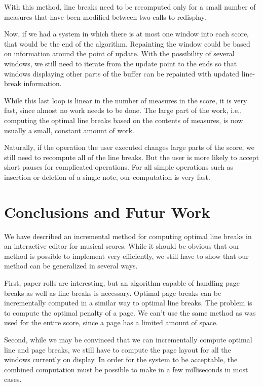 \documentclass{article}
\begin{document}
With this method, line breaks need to be recomputed only for a small
number of measures that have been modified between two calls to
redisplay. 

Now, if we had a system in which there is at most one window into
each score, that would be the end of the algorithm.  Repainting the
window could be based on information around the point of update.  With
the possibility of several windows, we still need to iterate from the
update point to the ends so that windows displaying other parts of the
buffer can be repainted with updated line-break information. 

While this last loop is linear in the number of measures in the score,
it is very fast, since almost no work needs to be done.  The large
part of the work, i.e., computing the optimal line breaks based on the
contents of measures, is now usually a small, constant amount of
work. 

Naturally, if the operation the user executed changes large parts of
the score, we still need to recompute all of the line breaks.  But the
user is more likely to accept short pauses for complicated
operations.  For all simple operations such as insertion or deletion
of a single note, our computation is very fast.

\section{Conclusions and Futur Work}

We have described an incremental method for computing optimal line
breaks in an interactive editor for musical scores.  While it should
be obvious that our method is possible to implement very efficiently,
we still have to show that our method can be generalized in several
ways.

First, paper rolls are interesting, but an algorithm capable of
handling page breaks as well as line breaks is necessary.  Optimal
page breaks can be incrementally computed in a similar way to optimal
line breaks.  The problem is to compute the optimal penalty of a
page.  We can't use the same method as was used for the entire score,
since a page has a limited amount of space.  

Second, while we may be convinced that we can incrementally compute
optimal line and page breaks, we still have to compute the page layout
for all the windows currently on display.  In order for the system to
be acceptable, the combined computation must be possible to make in a
few milliseconds in most cases.
\end{document}
